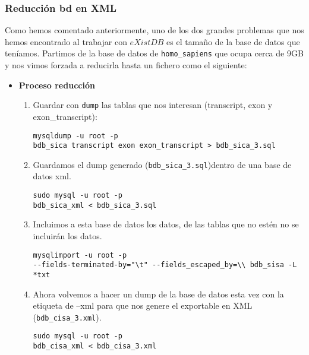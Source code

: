 \documentclass[12pt,a4paper]{article}
\begin{document}
\subsubsection{Reducción bd en XML} \label{pto421}

Como hemos comentado anteriormente, uno de los dos grandes problemas que nos hemos encontrado al trabajar con $eXistDB$ es el tamaño de la base de datos que teníamos. Partimos de la base de datos de \verb|homo_sapiens| que ocupa cerca de 9GB y nos vimos forzada a reducirla hasta un fichero como el siguiente:

\begin{itemize}

\item \textbf{Proceso reducción}

\begin{enumerate}

\item Guardar con \verb|dump| las tablas que nos interesan (transcript, exon y exon\_transcript):

\begin{verbatim}
mysqldump -u root -p 
bdb_sica transcript exon exon_transcript > bdb_sica_3.sql
\end{verbatim}


\item Guardamos el dump generado (\verb|bdb_sica_3.sql|)dentro de una base de datos xml.
\begin{verbatim}
sudo mysql -u root -p 
bdb_sica_xml < bdb_sica_3.sql
\end{verbatim}

\item Incluimos a esta base de datos los datos, de las tablas que no estén no se incluirán los datos.
\begin{verbatim}
mysqlimport -u root -p 
--fields-terminated-by="\t" --fields_escaped_by=\\ bdb_sisa -L *txt
\end{verbatim}


\item Ahora volvemos a hacer un dump de la base de datos esta vez con la etiqueta de --xml para que nos genere el exportable en XML (\verb|bdb_cisa_3.xml|).

\begin{verbatim}
sudo mysql -u root -p 
bdb_cisa_xml < bdb_cisa_3.xml
\end{verbatim}
\end{enumerate}


\end{itemize}
\end{document}
